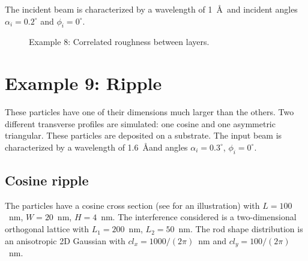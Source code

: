 The incident beam is characterized by a wavelength of 1~\AA \ and incident angles $\alpha_i=0.2^{\circ}$ and $\phi_i=0^{\circ}$. 
\begin{figure}[H]
\hfill
{}
\hfill
{}
\hfill
\caption{Example 8: Correlated roughness between layers.}
\label{fig:PythonEx8Rough}
\end{figure}

 
\newpage
\section{Example 9: Ripple}
These particles have one of their dimensions much larger than the others.
Two different transverse profiles are simulated: one cosine and one asymmetric triangular.
These particles are deposited on a substrate. The input beam is characterized by a wavelength of 1.6~\AA and angles $\alpha_i=0.3^{\circ}$, $\phi_i=0^{\circ}$.

\subsection{Cosine ripple}
The particles have a cosine cross section (see  for an illustration) with $L=100$~nm, $W=20$~nm, $H=4$~nm.
The interference considered is a two-dimensional orthogonal lattice with $L_1=200$~nm, $L_2=50$~nm. The rod shape distribution is an anisotropic 2D Gaussian with $cl_x=1000/(2\pi)$~nm and  $cl_y=100/(2\pi)$~nm.

